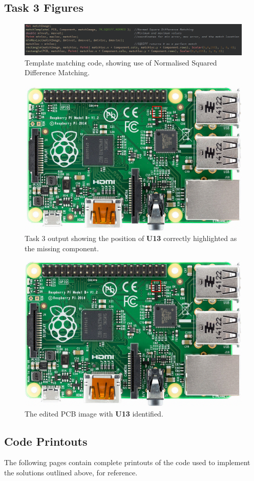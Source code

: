 \documentclass[conference]{IEEEtran}
\begin{document}
\subsection{Task 3 Figures}\label{app:T3}
\begin{figure}[H]
\centering
\includegraphics[width=5in]{t3_code1}
\caption{Template matching code, showing use of Normalised Squared Difference Matching.}
\label{fig_t3code}
\end{figure}

\begin{figure}[H]
\centering
\includegraphics[width=5in]{t3_missing}
\caption{Task 3 output showing the position of \textbf{U13} correctly highlighted as the missing component.}
\label{fig:t3_missing}
\end{figure}
\begin{figure}[H]
\centering
\includegraphics[width=5in]{t3_complete}
\caption{The edited PCB image with \textbf{U13} identified.}
\label{fig:t3_complete}
\end{figure}
\subsection{Code Printouts}
The following pages contain complete printouts of the code used to implement the solutions outlined above, for reference.



\end{document}
